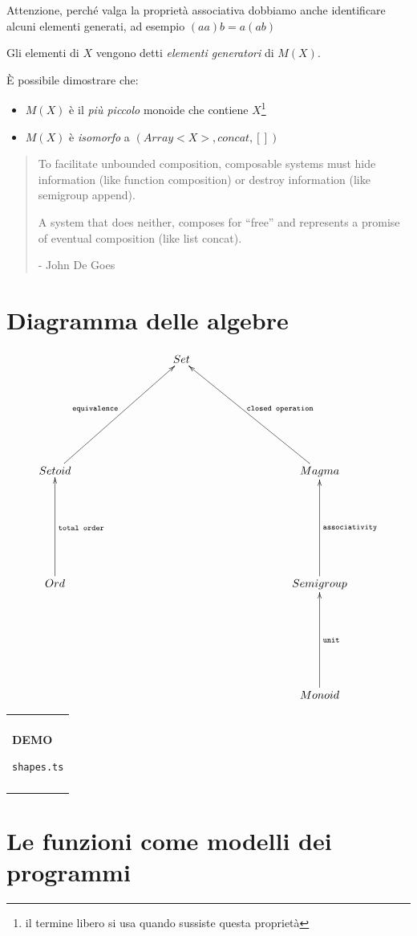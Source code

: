 \documentclass[12pt]{article}
\theoremstyle{definition}
\newenvironment{demo}
    {\begin{center}
    \begin{tabular}{|p{0.9\textwidth}|}
    \hline\\
    }
    {
    \\\\\hline
    \end{tabular}
    \end{center}
    }
\begin{document}
Attenzione, perché valga la proprietà associativa dobbiamo anche identificare alcuni elementi generati, ad esempio $(aa)b = a(ab)$

Gli elementi di $X$ vengono detti \emph{elementi generatori} di $M(X)$.

È possibile dimostrare che:

\begin{itemize}
  \item $M(X)$ è il \emph{più piccolo} monoide che contiene $X$\footnote{il termine libero si usa quando sussiste questa proprietà}
  \item $M(X)$ è \emph{isomorfo} a $(Array<X>, concat, [])$
\end{itemize}

\begin{quote}
To facilitate unbounded composition, composable systems must hide information (like function composition) or destroy information
(like semigroup append).

A system that does neither, composes for “free” and represents a promise of eventual composition (like list concat).

- John De Goes
\end{quote}

\section{Diagramma delle algebre}

\[
\xymatrixrowsep{3cm}
\xymatrixcolsep{3cm}
\xymatrix{
  & Set \\
  Setoid \ar[ur]^{\texttt{equivalence}} & & Magma \ar[ul]_{\texttt{closed operation}} \\
  Ord \ar[u]_{\texttt{total order}} & & Semigroup \ar[u]_{\texttt{associativity}} \\
  & & Monoid \ar[u]_{\texttt{unit}} \\
}
\]

\begin{demo}
\begin{center}
\textbf{DEMO}

\texttt{shapes.ts}
\end{center}
\end{demo}

\newpage

\section{Le funzioni come modelli dei programmi}
\end{document}
